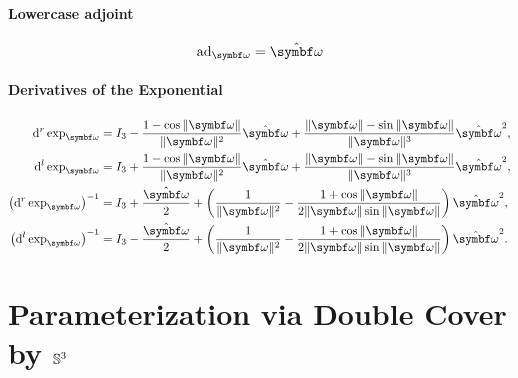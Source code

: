 \begin{properties}[breakable, title={$\SOthree$}]
  \paragraph{Lowercase adjoint}
  \begin{equation}
    \ad_\bomega = \hat \bomega
  \end{equation}

  \paragraph{Derivatives of the Exponential}
  \begin{subequations}
    \begin{align}
      \mathrm{d}^r \exp_{\bomega}                     & =        I_3 - \frac{1 - \cos \| \bomega \|}{\| \bomega \|^2} \hat {\bomega} + \frac{ \| \bomega \| - \sin \| \bomega \| }{\| \bomega\|^3} \hat {\bomega}^2, \\
      \mathrm{d}^l \exp_{\bomega}                     & = I_3 + \frac{1 - \cos \| \bomega \|}{\| \bomega \|^2} \hat {\bomega} + \frac{ \| \bomega \| - \sin \| \bomega \| }{\| \bomega\|^3} \hat {\bomega}^2,        \\
      \left( \mathrm{d}^r \exp_{\bomega} \right)^{-1} & = I_3 + \frac{\hat \bomega}{2} + \left( \frac{1}{\| \bomega \|^2} - \frac{1 + \cos \| \bomega \| }{2 \|\bomega \| \sin \|\bomega \|} \right) \hat \bomega^2, \\
      \left( \mathrm{d}^l \exp_{\bomega} \right)^{-1} & = I_3 - \frac{\hat \bomega}{2} + \left( \frac{1}{\| \bomega \|^2} - \frac{1 + \cos \| \bomega \| }{2 \|\bomega \| \sin \|\bomega \|} \right) \hat \bomega^2.
    \end{align}
  \end{subequations}
\end{properties}

\section{Parameterization via Double Cover by \texorpdfstring{${\mathbb{S}^3}$}{S3}}

